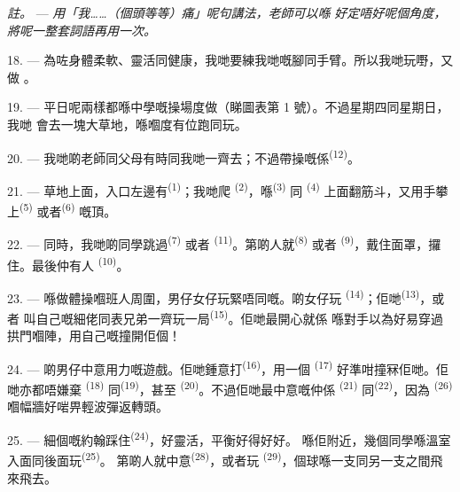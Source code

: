 \textit{註。} --- \textit{用「我……（個頭等等）痛」呢句講法，老師可以喺}
\textit{好定唔好呢個角度，將呢一整套詞語再用一次。}

\VUsaut{5.0mm}
\VUsaut{2.4mm}
\VUsaut{3.0mm}

18. --- 為咗身體柔軟、靈活同健康，我哋要練我哋嘅腳同手臂。所以我哋玩嘢，又做
。

19. --- 平日呢兩樣都喺中學嘅操場度做（睇圖表第 1 號）。不過星期四同星期日，我哋
會去一塊大草地，喺嗰度有位跑同玩。

20. --- 我哋啲老師同父母有時同我哋一齊去；不過帶操嘅係\textsuperscript{(12)}。

21. --- 草地上面，入口左邊有\textsuperscript{(1)}；我哋爬
\textsuperscript{(2)}，喺\textsuperscript{(3)} 同
\textsuperscript{(4)} 上面翻筋斗，又用手攀上\textsuperscript{(5)}
或者\textsuperscript{(6)} 嘅頂。

22. --- 同時，我哋啲同學跳過\textsuperscript{(7)} 或者
\textsuperscript{(11)}。第啲人就\textsuperscript{(8)} 或者
\textsuperscript{(9)}，戴住面罩，攞住。最後仲有人
\textsuperscript{(10)}。

\VUsaut{4.6mm}
\VUsaut{3.0mm}

23. --- 喺做體操嗰班人周圍，男仔女仔玩緊唔同嘅。啲女仔玩
\textsuperscript{(14)}；佢哋\textsuperscript{(13)}，或者
叫自己嘅細佬同表兄弟一齊玩一局\textsuperscript{(15)}。佢哋最開心就係
喺對手以為好易穿過拱門嗰陣，用自己嘅撞開佢個！

24. --- 啲男仔中意用力嘅遊戲。佢哋鍾意打\textsuperscript{(16)}，用一個
\textsuperscript{(17)} 好準咁撞冧佢哋。佢哋亦都唔嫌棄
\textsuperscript{(18)} 同\textsuperscript{(19)}，甚至
\textsuperscript{(20)}。不過佢哋最中意嘅仲係
\textsuperscript{(21)} 同\textsuperscript{(22)}，因為
\textsuperscript{(26)} 嗰幅牆好啱畀輕波彈返轉頭。

25. --- 細個嘅約翰踩住\textsuperscript{(24)}，好靈活，平衡好得好好。
喺佢附近，幾個同學喺溫室入面同後面玩\textsuperscript{(25)}。
第啲人就中意\textsuperscript{(28)}，或者玩
\textsuperscript{(29)}，個球喺一支同另一支之間飛來飛去。


